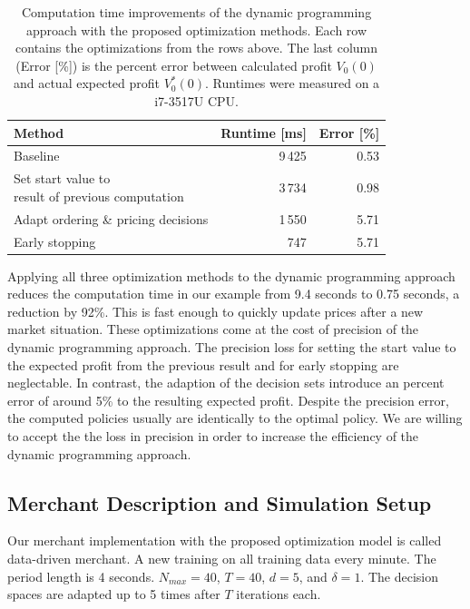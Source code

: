 \begin{table}[t]
	\centering
	\begin{tabular}{ lrr }
		\toprule
		\textbf{Method} & \textbf{Runtime [ms]} & \textbf{Error [\%]} \\
		\midrule
		Baseline & 9\,425 & 0.53 \\
		\makecell[l]{Set start value to \\ result of previous computation} & 3\,734 & 0.98 \\
		Adapt ordering \& pricing decisions & 1\,550 & 5.71 \\
		Early stopping & 747 & 5.71\\
		\bottomrule
	\end{tabular}
	\caption[Dynamic Programming: Computation Time Improvements]{
	Computation time improvements of the dynamic programming approach with the proposed optimization methods.
	Each row contains the optimizations from the rows above. The last column (Error [\%]) is the percent error between calculated profit $V_0(0)$ and actual expected profit $V^*_0(0)$. Runtimes were measured on a i7-3517U CPU.}
	\label{tab:speedup}
\end{table}

Applying all three optimization methods to the dynamic programming approach reduces the computation time in our example from 9.4 seconds to 0.75 seconds, a reduction by 92\%.
This is fast enough to quickly update prices after a new market situation.
These optimizations come at the cost of precision of the dynamic programming approach.
The precision loss for setting the start value to the expected profit from the previous result and for early stopping are neglectable.
In contrast, the adaption of the decision sets introduce an percent error of around 5\% to the resulting expected profit.
Despite the precision error, the computed policies usually are identically to the optimal policy.
We are willing to accept the the loss in precision in order to increase the efficiency of the dynamic programming approach.

\subsection{Merchant Description and Simulation Setup}
\label{section:setup}
Our merchant implementation with the proposed optimization model is called data-driven merchant.
A new training on all training data every minute.
The period length is 4 seconds.
$N_{max} = 40$, $T = 40$, $d=5$, and $\delta=1$.
The decision spaces are adapted up to 5 times after $T$ iterations each.


